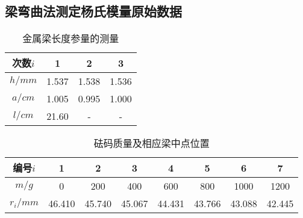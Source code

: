 \documentclass[a4 paper,12pt]{article}
\begin{document}
\subsection{梁弯曲法测定杨氏模量原始数据}
\begin{table}[H]
	\caption{金属梁长度参量的测量}
	\label{金属梁长度参量的测量}
	\centering
	\begin{tabular}{*{4}{c}}
		\toprule[0.5mm]
		次数$i$&1&2&3\\
		\midrule
		$h/mm$&1.537&1.538&1.536\\
		$a/cm$&1.005&0.995&1.000\\
		$l/cm$&21.60&-&-\\
		\bottomrule[0.5mm]
	\end{tabular}
\end{table}
\begin{table}[H]
	\caption{砝码质量及相应梁中点位置}
	\label{砝码质量及相应梁中点位置}
	\centering
	\begin{tabular}{*{8}{c}}
		\toprule[0.5mm]
		编号$i$&1&2&3&4&5&6&7\\
		\midrule
		$m/g$&0&200&400&600&800&1000&1200\\
		$r_{i}/mm$&46.410&45.740&45.067&44.431&43.766&43.088&42.445\\
		\bottomrule[0.5mm]
	\end{tabular}
\end{table}
\end{document}
